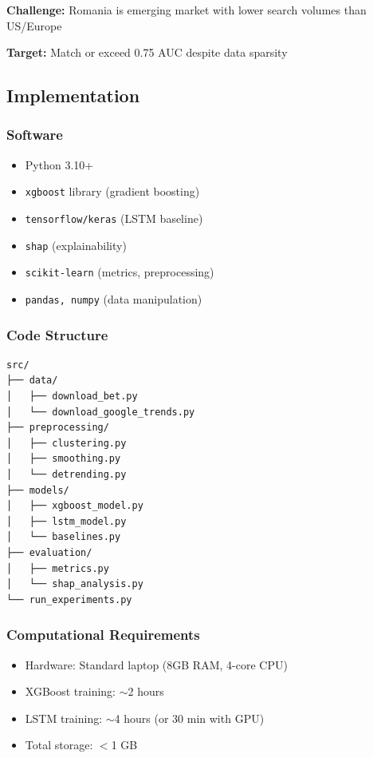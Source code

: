 \documentclass[12pt,a4paper]{article}
\begin{document}
\textbf{Challenge:} Romania is emerging market with lower search volumes than US/Europe

\textbf{Target:} Match or exceed 0.75 AUC despite data sparsity

\subsection{Implementation}

\subsubsection{Software}

\begin{itemize}
    \item Python 3.10+
    \item \texttt{xgboost} library (gradient boosting)
    \item \texttt{tensorflow/keras} (LSTM baseline)
    \item \texttt{shap} (explainability)
    \item \texttt{scikit-learn} (metrics, preprocessing)
    \item \texttt{pandas, numpy} (data manipulation)
\end{itemize}

\subsubsection{Code Structure}

\begin{verbatim}
src/
├── data/
│   ├── download_bet.py
│   └── download_google_trends.py
├── preprocessing/
│   ├── clustering.py
│   ├── smoothing.py
│   └── detrending.py
├── models/
│   ├── xgboost_model.py
│   ├── lstm_model.py
│   └── baselines.py
├── evaluation/
│   ├── metrics.py
│   └── shap_analysis.py
└── run_experiments.py
\end{verbatim}

\subsubsection{Computational Requirements}

\begin{itemize}
    \item Hardware: Standard laptop (8GB RAM, 4-core CPU)
    \item XGBoost training: $\sim$2 hours
    \item LSTM training: $\sim$4 hours (or 30 min with GPU)
    \item Total storage: $<$1 GB
\end{itemize}
\end{document}
